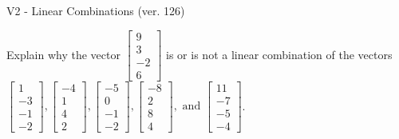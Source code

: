 \begin{exercise}
  \begin{exerciseTitle}V2 - Linear Combinations (ver. 126)\end{exerciseTitle}
  \begin{exerciseStatement}
    Explain why the vector \(\left[\begin{array}{c}
9 \\
3 \\
-2 \\
6
\end{array}\right]\)  is or is not a linear 
	combination of the vectors \(\left[\begin{array}{c}
1 \\
-3 \\
-1 \\
-2
\end{array}\right] , \left[\begin{array}{c}
-4 \\
1 \\
4 \\
2
\end{array}\right] , \left[\begin{array}{c}
-5 \\
0 \\
-1 \\
-2
\end{array}\right] , \left[\begin{array}{c}
-8 \\
2 \\
8 \\
4
\end{array}\right] , \text{ and } \left[\begin{array}{c}
11 \\
-7 \\
-5 \\
-4
\end{array}\right]\).
	



\end{exerciseStatement}
\end{exercise}
